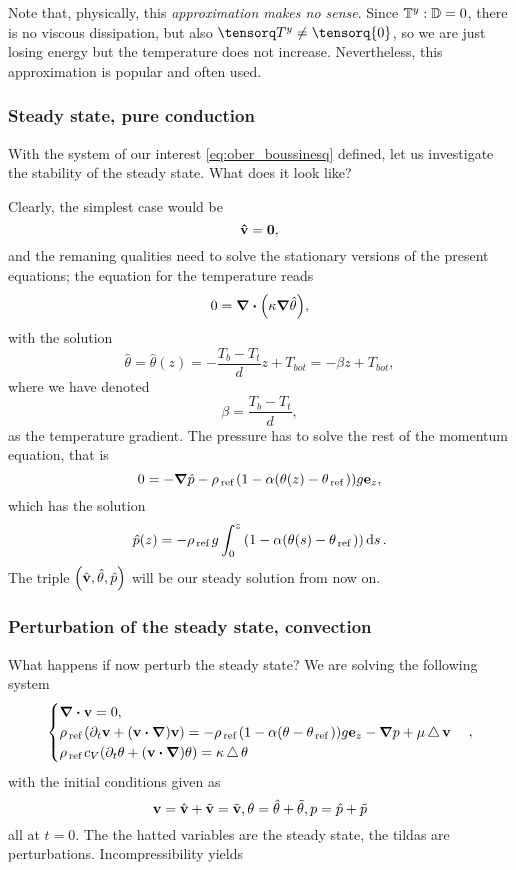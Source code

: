 \documentclass[../main.tex]{subfiles}
\begin{document}
Note that, physically, this \textit{approximation makes no sense}. Since $\mathbb{T}^y : \mathbb{D} = 0$, there is no viscous dissipation, but also $\cstress \neq \tensorq{0}$, so we are just losing energy but the temperature does not increase. Nevertheless, this approximation is popular and often used.

\subsubsection{Steady state, pure conduction}
\label{sec:steady_state}

With the system of our interest \ref{eq:ober_boussinesq} defined, let us investigate the stability of the steady state. What does it look like?

Clearly, the simplest case would be
\[
	\vb{\hat{v}} = \vb{0},
\]
and the remaning qualities need to solve the stationary versions of the present equations; the equation for the temperature reads 
\[
	0 = \divergence{\qty(\kappa \grad \hat{\theta})},
\]
with the solution 
\begin{equation}
	\label{eq:steady_temp}
	\hat{\theta} = \hat{\theta}(z) = - \frac{T_{b}-T_{t}}{d}z + T_{bot} = -\beta z + T_{bot},
\end{equation}
where we have denoted
\[
	\beta = \frac{T_b - T_t}{d},
\]
as the temperature gradient.
The pressure has to solve the rest of the momentum equation, that is
\[
	0 = - \grad \hat{p} - \rho_{\, \text{ref} \,}\qty(1-\alpha\qty(\theta(z) - \theta_{\, \text{ref} \,}))g \vb{e}_{z},
\]
which has the solution
\[
	\hat{p}(z) = -\rho_{\, \text{ref} \,}g \int_0^z \qty(1-\alpha\qty(\theta(s)-\theta_{\, \text{ref} \,}))\dd{s}.
\]
The triple $\qty(\hat{\vb{v}}, \hat{\theta}, \hat{p})$ will be our steady solution from now on.

\subsubsection{Perturbation of the steady state, convection}
\label{sec:perturbation}
What happens if now perturb the steady state? We are solving the following system
\[
	\begin{cases}
		\divergence{\vb{v}} = 0, \\
		\rho_{\, \text{ref} \,}\qty(\partial_t \vb{v}+ \qty(\vb{v} \vdot \grad)\vb{v}) = -\rho_{\, \text{ref} \,}\qty(1- \alpha\qty(\theta-\theta_{\, \text{ref} \,}))g \vb{e}_z - \grad p + \mu \laplace \vb{v}\\ 
		\rho_{\, \text{ref} \,} c_{V}\qty(\partial_t \theta + \qty(\vb{v} \vdot \grad)\theta) = \kappa \laplace\theta
	\end{cases},
\]
with the initial conditions given as
\[
	\vb{v} = \hat{\vb{v}} + \tilde{\vb{v}} = \tilde{\vb{v}}, \theta = \hat{\theta}+ \tilde{\theta}, p = \hat{p}+ \tilde{p}
\]
all at $t =0$. The the hatted variables are the steady state, the tildas are perturbations. Incompressibility yields
\end{document}
